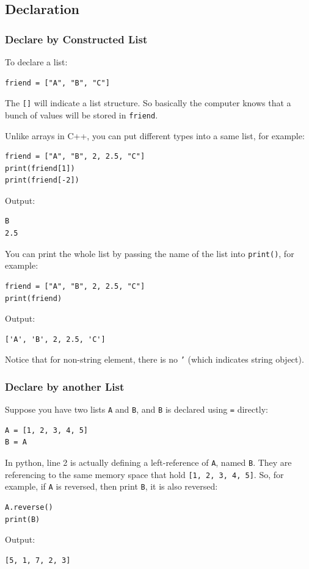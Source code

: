 \documentclass[12pt]{book}
\begin{document}
\subsection{Declaration}
\label{sec:org316c950}
\subsubsection{Declare by Constructed List}
\label{sec:orgba22a4b}
To declare a list:
\begin{verbatim}
friend = ["A", "B", "C"]
\end{verbatim}
The \texttt{[]} will indicate a list structure. So basically the computer knows that a bunch of values will be stored in \texttt{friend}.

Unlike arrays in C++, you can put different types into a same list, for example:
\begin{verbatim}
friend = ["A", "B", 2, 2.5, "C"]
print(friend[1])
print(friend[-2])
\end{verbatim}
Output:
\begin{verbatim}
B
2.5
\end{verbatim}

You can print the whole list by passing the name of the list into \texttt{print()}, for example:
\begin{verbatim}
friend = ["A", "B", 2, 2.5, "C"]
print(friend)
\end{verbatim}
Output:
\begin{verbatim}
['A', 'B', 2, 2.5, 'C']
\end{verbatim}
Notice that for non-string element, there is no \texttt{'} (which indicates string object).
\subsubsection{Declare by another List}
\label{sec:org333a948}
Suppose you have two lists \texttt{A} and \texttt{B}, and \texttt{B} is declared using \texttt{=} directly:
\begin{verbatim}
A = [1, 2, 3, 4, 5]
B = A
\end{verbatim}
In python, line 2 is actually defining a left-reference of \texttt{A}, named \texttt{B}. They are referencing to the same memory space that hold \texttt{[1, 2, 3, 4, 5]}. So, for example, if \texttt{A} is reversed, then print \texttt{B}, it is also reversed:
\begin{verbatim}
A.reverse()
print(B)
\end{verbatim}
Output:
\begin{verbatim}
[5, 1, 7, 2, 3]
\end{verbatim}
\end{document}

